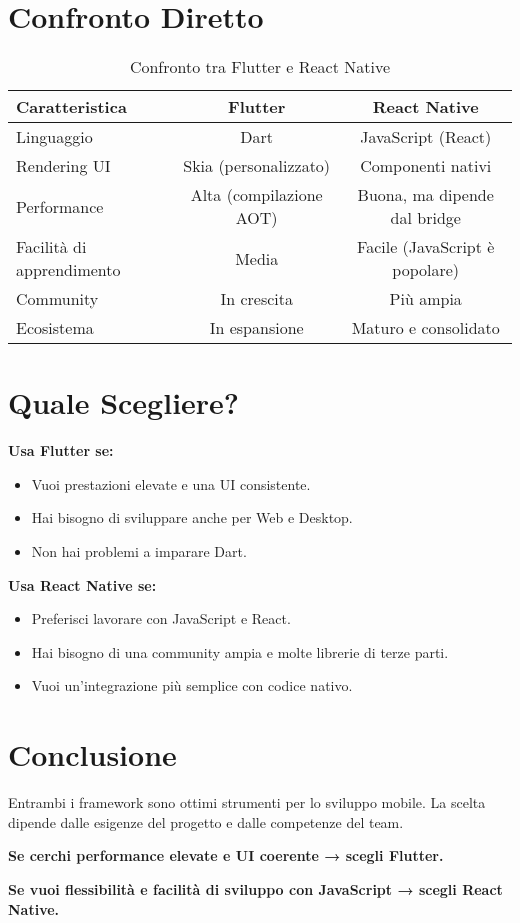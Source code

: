 \documentclass[a4paper,10pt]{article}
\begin{document}
\section{Confronto Diretto}
\begin{table}[h]
    \centering
    \begin{tabular}{lcc}
        \toprule
        \textbf{Caratteristica} & \textbf{Flutter} & \textbf{React Native} \\
        \midrule
        Linguaggio & Dart & JavaScript (React) \\
        Rendering UI & Skia (personalizzato) & Componenti nativi \\
        Performance & Alta (compilazione AOT) & Buona, ma dipende dal bridge \\
        Facilità di apprendimento & Media & Facile (JavaScript è popolare) \\
        Community & In crescita & Più ampia \\
        Ecosistema & In espansione & Maturo e consolidato \\
        \bottomrule
    \end{tabular}
    \caption{Confronto tra Flutter e React Native}
\end{table}

\section{Quale Scegliere?}
\textbf{Usa Flutter se:}
\begin{itemize}
    \item Vuoi prestazioni elevate e una UI consistente.
    \item Hai bisogno di sviluppare anche per Web e Desktop.
    \item Non hai problemi a imparare Dart.
\end{itemize}

\textbf{Usa React Native se:}
\begin{itemize}
    \item Preferisci lavorare con JavaScript e React.
    \item Hai bisogno di una community ampia e molte librerie di terze parti.
    \item Vuoi un’integrazione più semplice con codice nativo.
\end{itemize}

\section{Conclusione}
Entrambi i framework sono ottimi strumenti per lo sviluppo mobile. La scelta dipende dalle esigenze del progetto e dalle competenze del team. 

\textbf{Se cerchi performance elevate e UI coerente → scegli Flutter.}

\textbf{Se vuoi flessibilità e facilità di sviluppo con JavaScript → scegli React Native.}
\end{document}
